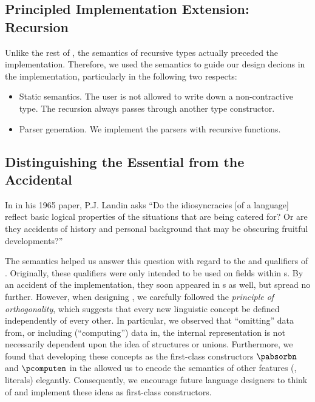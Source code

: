 \subsection{Principled Implementation Extension: Recursion}

Unlike the rest of \pads{}, the semantics of recursive types actually
preceded the implementation. Therefore, we used the semantics to guide
our design decions in the implementation, particularly in the
following two respects:
\begin{itemize}
\item Static semantics. The user is not allowed to write down a
  non-contractive type. The recursion always passes through another
  type constructor.
\item Parser generation. We implement the parsers with recursive
  functions.
\end{itemize}


\subsection{Distinguishing the Essential from the Accidental}

In in his 1965 paper, P.J. Landin asks ``Do the idiosyncracies [of a
language] reflect basic logical properties of the situations that are
being catered for?  Or are they accidents of history and personal
background that may be obscuring fruitful developments?''  

The semantics helped us answer this question with regard to the \Pomit{}
and \Pcompute{} qualifiers of \pads{}.  Originally, these qualifiers
were only intended to be used on fields within \Pstruct{}s.
By an accident of the implementation, they soon appeared in \Punion{}s
as well, but spread no further. However, when designing \ddc{},
we carefully followed the {\em principle of orthogonality},
which suggests that every new linguistic concept
be defined independently of every other.  In particular, we observed that
``omitting'' data from, or including (``computing'') data in,
the internal representation is not necessarily dependent upon 
the idea of structures or unions.  Furthermore, we found that
developing these concepts as the first-class constructors
$\pabsorbn$ and $\pcomputen$ in the \ddc{} allowed us to encode
the semantics of other \pads{} features (\eg, literals) elegantly.
Consequently, we encourage future language designers to think of and
implement these ideas as first-class constructors.

